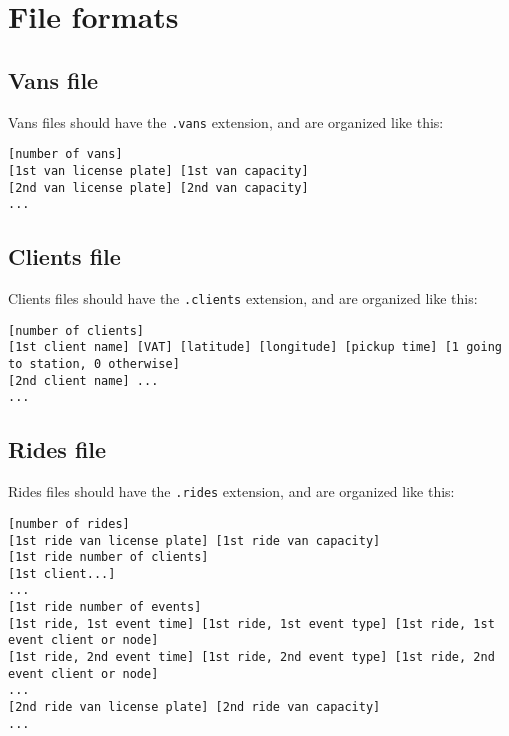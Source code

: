 \chapter{File formats} \label{appendix-fileformat}
\section{Vans file}
Vans files should have the \texttt{.vans} extension, and are organized like this:
\begin{lstlisting}[basewidth=0.5em]
[number of vans]
[1st van license plate] [1st van capacity]
[2nd van license plate] [2nd van capacity]
...
\end{lstlisting}

\section{Clients file}
Clients files should have the \texttt{.clients} extension, and are organized like this:
\begin{lstlisting}[basewidth=0.5em]
[number of clients]
[1st client name] [VAT] [latitude] [longitude] [pickup time] [1 going to station, 0 otherwise]
[2nd client name] ...
...
\end{lstlisting}

\section{Rides file}
Rides files should have the \texttt{.rides} extension, and are organized like this:
\begin{lstlisting}[basewidth=0.5em]
[number of rides]
[1st ride van license plate] [1st ride van capacity]
[1st ride number of clients]
[1st client...]
...
[1st ride number of events]
[1st ride, 1st event time] [1st ride, 1st event type] [1st ride, 1st event client or node]
[1st ride, 2nd event time] [1st ride, 2nd event type] [1st ride, 2nd event client or node]
...
[2nd ride van license plate] [2nd ride van capacity]
...
\end{lstlisting}

